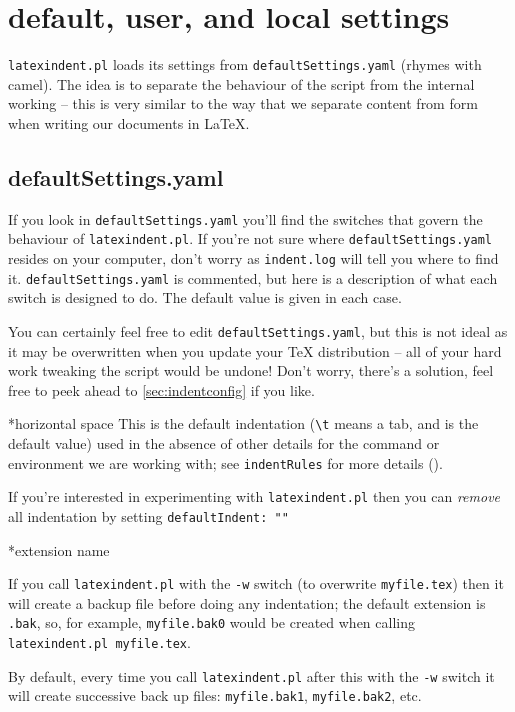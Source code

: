 \documentclass[8pt]{article}
\begin{document}
\section{default, user, and local settings}\label{sec:defuseloc}
\texttt{latexindent.pl} loads its settings from \texttt{defaultSettings.yaml}
(rhymes with camel). The idea is to separate the behaviour of the script
from the internal working -- this is very similar to the way that we separate content
from form when writing our documents in \LaTeX.

\subsection{defaultSettings.yaml}
If you look in \texttt{defaultSettings.yaml} you'll find the switches
that govern the behaviour of \texttt{latexindent.pl}. If you're not sure where
\texttt{defaultSettings.yaml} resides on your computer, don't worry as \texttt{indent.log}
will tell you where to find it.
\texttt{defaultSettings.yaml} is commented,
but here is a description of what each switch is designed to do. The default
value is given in each case.

You can certainly feel free to edit \texttt{defaultSettings.yaml}, but
this is not ideal as it may be overwritten when you update your \TeX{} distribution --
all of your hard work tweaking the script would be undone! Don't worry,
there's a solution, feel free to peek ahead to \cref{sec:indentconfig} if you like.

*{horizontal space}
This is the default indentation (\lstinline!\t! means a tab, and is the default value) used in the absence of other details
for the command or environment we are working with; see \texttt{indentRules}
for more details ().

If you're interested in experimenting with \texttt{latexindent.pl} then you
can \emph{remove} all indentation by setting \texttt{defaultIndent: ""}

*{extension name}

If you call \texttt{latexindent.pl} with the \texttt{-w} switch (to overwrite
\texttt{myfile.tex}) then it will create a backup file before doing
any indentation; the default extension is \texttt{.bak}, so, for example, \texttt{myfile.bak0}
would be created when calling \texttt{latexindent.pl myfile.tex}.

By default, every time you call \texttt{latexindent.pl} after this with
the \texttt{-w} switch it will create successive back up files: \texttt{myfile.bak1}, \texttt{myfile.bak2},
etc.
\end{document}
